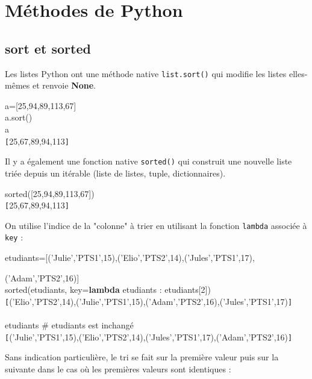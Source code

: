 \documentclass[t,11pt]{article}
\begin{document}
\newpage
\section{Méthodes de Python}

\subsection{sort et sorted}
Les listes Python ont une méthode native \texttt{list.sort()} qui modifie les listes elles-mêmes et renvoie \textbf{None}.
\vspace{-0.5cm}
\begin{pythonshell}
\invite a=[25,94,89,113,67]\\
\invite a.sort()\\
\invite a\\
\verb![!25,67,89,94,113\verb!]!
\end{pythonshell}

Il y a également une fonction native \texttt{sorted()} qui construit une nouvelle liste triée depuis un itérable (liste de listes, tuple, dictionnaires).

\begin{pythonshell}
\invite sorted([25,94,89,113,67])\\
\verb![!25,67,89,94,113\verb!]!
\end{pythonshell}

\vspace{-0.5cm}
On utilise l'indice de la "colonne" à trier en utilisant la fonction \texttt{lambda} associée à \texttt{key} :
\vspace{-0.5cm}
\begin{pythonshell}
\invite etudiants=[('Julie','PTS1',15),('Elio','PTS2',14),('Jules','PTS1',17),

('Adam','PTS2',16)]\\
\invite sorted(etudiants, key=\textbf{lambda} etudiants : etudiants[2])\\
\verb![!('Elio','PTS2',14),('Julie','PTS1',15),('Adam','PTS2',16),('Jules','PTS1',17)\verb!]!
\\
\\
\invite etudiants  \indente \# etudiants est inchangé\\
\verb![!('Julie','PTS1',15),('Elio','PTS2',14),('Jules','PTS1',17),('Adam','PTS2',16)\verb!]!
\end{pythonshell}

\vspace{-0.5cm}
Sans indication particulière, le tri se fait sur la première valeur puis sur la suivante dans le cas où les premières valeurs sont identiques :
\vspace{-0.5cm}
\end{document}
